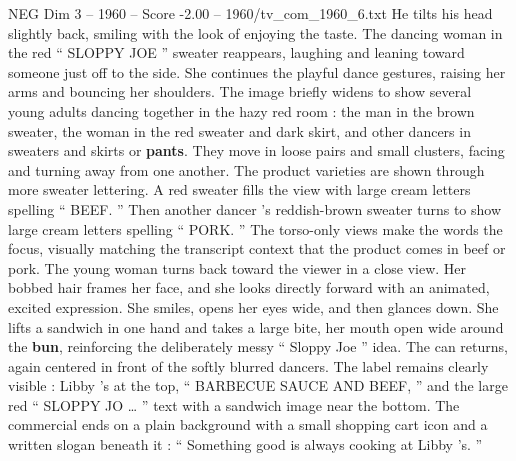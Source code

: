 \begin{textsample}{NEG Dim 3 – 1960 – Score -2.00 – 1960/tv\_com\_1960\_6.txt}
He tilts his head slightly back, smiling with the look of enjoying the taste.
The dancing woman in the red “ SLOPPY JOE ” sweater reappears, laughing and leaning toward someone just off to the side.
She continues the playful dance gestures, raising her arms and bouncing her shoulders.
The image briefly widens to show several young adults dancing together in the hazy red room : the man in the brown sweater, the woman in the red sweater and dark skirt, and other dancers in sweaters and skirts or \textbf{pants}.
They move in loose pairs and small clusters, facing and turning away from one another.
The product varieties are shown through more sweater lettering.
A red sweater fills the view with large cream letters spelling “ BEEF. ” Then another dancer ’s reddish-brown sweater turns to show large cream letters spelling “ PORK. ” The torso-only views make the words the focus, visually matching the transcript context that the product comes in beef or pork.
The young woman turns back toward the viewer in a close view.
Her bobbed hair frames her face, and she looks directly forward with an animated, excited expression.
She smiles, opens her eyes wide, and then glances down.
She lifts a sandwich in one hand and takes a large bite, her mouth open wide around the \textbf{bun}, reinforcing the deliberately messy “ Sloppy Joe ” idea.
The can returns, again centered in front of the softly blurred dancers.
The label remains clearly visible : Libby ’s at the top, “ BARBECUE SAUCE AND BEEF, ” and the large red “ SLOPPY JO … ” text with a sandwich image near the bottom.
The commercial ends on a plain background with a small shopping cart icon and a written slogan beneath it : “ Something good is always cooking at Libby ’s. ”

\end{textsample}
